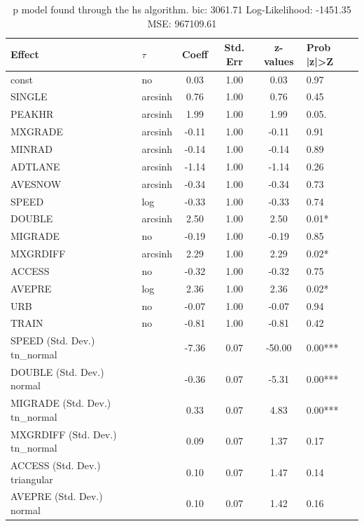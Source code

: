 \begin{table}
	\caption{p model found through the hs algorithm. bic: 3061.71 Log-Likelihood: -1451.35 MSE: 967109.61}
	\begin{center}
		\begin{tabular}{|l|l|c|c|c|l|}
			\hline
			Effect & $\tau$ & Coeff & Std. Err & z-values & Prob |z|>Z \\
			\hline
			const & no & 0.03 & 1.00 & 0.03 & 0.97 \\
			\hline
			SINGLE & arcsinh & 0.76 & 1.00 & 0.76 & 0.45 \\
			\hline
			PEAKHR & arcsinh & 1.99 & 1.00 & 1.99 & 0.05. \\
			\hline
			MXGRADE & arcsinh & -0.11 & 1.00 & -0.11 & 0.91 \\
			\hline
			MINRAD & arcsinh & -0.14 & 1.00 & -0.14 & 0.89 \\
			\hline
			ADTLANE & arcsinh & -1.14 & 1.00 & -1.14 & 0.26 \\
			\hline
			AVESNOW & arcsinh & -0.34 & 1.00 & -0.34 & 0.73 \\
			\hline
			SPEED & log & -0.33 & 1.00 & -0.33 & 0.74 \\
			\hline
			DOUBLE & arcsinh & 2.50 & 1.00 & 2.50 & 0.01* \\
			\hline
			MIGRADE & no & -0.19 & 1.00 & -0.19 & 0.85 \\
			\hline
			MXGRDIFF & arcsinh & 2.29 & 1.00 & 2.29 & 0.02* \\
			\hline
			ACCESS & no & -0.32 & 1.00 & -0.32 & 0.75 \\
			\hline
			AVEPRE & log & 2.36 & 1.00 & 2.36 & 0.02* \\
			\hline
			URB & no & -0.07 & 1.00 & -0.07 & 0.94 \\
			\hline
			TRAIN & no & -0.81 & 1.00 & -0.81 & 0.42 \\
			\hline
			SPEED (Std. Dev.) tn_normal &  & -7.36 & 0.07 & -50.00 & 0.00*** \\
			\hline
			DOUBLE (Std. Dev.) normal &  & -0.36 & 0.07 & -5.31 & 0.00*** \\
			\hline
			MIGRADE (Std. Dev.) tn_normal &  & 0.33 & 0.07 & 4.83 & 0.00*** \\
			\hline
			MXGRDIFF (Std. Dev.) tn_normal &  & 0.09 & 0.07 & 1.37 & 0.17 \\
			\hline
			ACCESS (Std. Dev.) triangular &  & 0.10 & 0.07 & 1.47 & 0.14 \\
			\hline
			AVEPRE (Std. Dev.) normal &  & 0.10 & 0.07 & 1.42 & 0.16 \\

\end{tabular}
\end{center}
\end{table}
